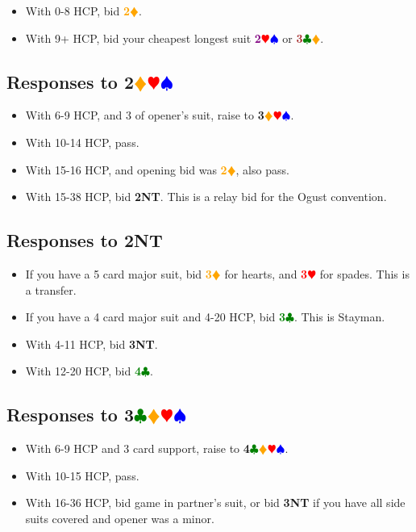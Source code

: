 \documentclass{article}
\newcommand{\Hs}{\textcolor{Red}{$\varheart$}}
\newcommand{\Ss}{\textcolor{Blue}{$\spadesuit$}}
\newcommand{\Ds}{\textcolor{Orange}{$\vardiamond$}}
\newcommand{\Cs}{\textcolor{Green}{$\clubsuit$}}
\newcommand{\NTs}{\textbf{\footnotesize{NT}}}
\renewcommand{\H}[1]{\textcolor{Red}{\textbf{#1}\Hs}}
\newcommand{\D}[1]{\textcolor{Orange}{\textbf{#1}\Ds}}
\newcommand{\C}[1]{\textcolor{Green}{\textbf{#1}\Cs}}
\newcommand{\NT}[1]{\textbf{#1\NTs}}
\newcommand{\suits}[1]{\textbf{#1}\Cs\Ds\Hs\Ss}
\newcommand{\minors}[1]{\textcolor{Brown}{\textbf{#1}}\Cs\Ds}
\newcommand{\majors}[1]{\textcolor{Purple}{\textbf{#1}}\Hs\Ss}
\newcommand{\notclubs}[1]{\textbf{#1}\Ds\Hs\Ss}
\begin{document}
\begin{itemize}
\item With 0-8 HCP, bid \D{2}.
\item With 9+ HCP, bid your cheapest longest suit \majors{2} or \minors{3}.
\end{itemize}

\subsection{Responses to \notclubs{2}}

\begin{itemize}
\item With 6-9 HCP, and 3 of opener's suit, raise to \notclubs{3}.
\item With 10-14 HCP, pass.
\item With 15-16 HCP, and opening bid was \D{2}, also pass.
\item With 15-38 HCP, bid \NT{2}. This is a relay bid for the Ogust convention.
\end{itemize}

\subsection{Responses to \NT{2}}

\begin{itemize}
\item If you have a 5 card major suit, bid \D{3} for hearts, and \H{3} for spades. This is a transfer.
\item If you have a 4 card major suit and 4-20 HCP, bid \C{3}. This is Stayman.
\item With 4-11 HCP, bid \NT{3}.
\item With 12-20 HCP, bid \C{4}.
\end{itemize}

\subsection{Responses to \suits{3}}

\begin{itemize}
\item With 6-9 HCP and 3 card support, raise to \suits{4}.
\item With 10-15 HCP, pass.
\item With 16-36 HCP, bid game in partner's suit, or bid \NT{3} if you have all side suits covered and opener was a minor.
\end{itemize}
\end{document}
